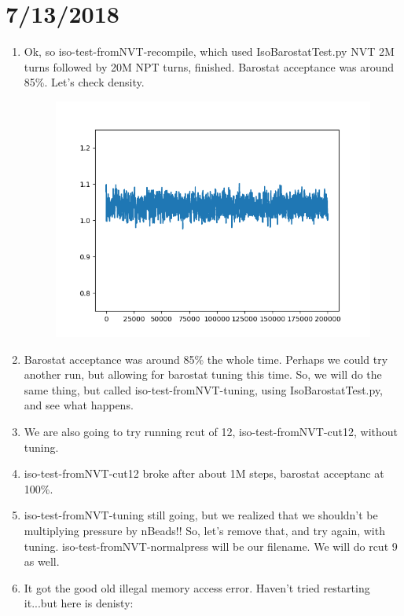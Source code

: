 \documentclass[12pt,reqno]{amsart}
\numberwithin{equation}{section}
\begin{document}
\section{7/13/2018}
\begin{enumerate}
\item Ok, so iso-test-fromNVT-recompile, which used IsoBarostatTest.py NVT 2M turns followed by 20M NPT turns, finished.  Barostat acceptance was around 85\%.  Let's check density.  
\begin{figure}[H]
\centering
\includegraphics[scale=0.6]{densities-iso-test-fromNVT-recompile}
\end{figure}
\item Barostat acceptance was around 85\% the whole time.  Perhaps we could try another run, but allowing for barostat tuning this time.  So, we will do the same thing, but called iso-test-fromNVT-tuning, using IsoBarostatTest.py, and see what happens.  
\item We are also going to try running rcut of 12, iso-test-fromNVT-cut12, without tuning. 
\item iso-test-fromNVT-cut12 broke after about 1M steps, barostat acceptanc at 100\%.  
\item iso-test-fromNVT-tuning still going, but we realized that we shouldn't be multiplying pressure by nBeads!!  So, let's remove that, and try again, with tuning.  iso-test-fromNVT-normalpress will be our filename.  We will do rcut 9 as well.  
\item It got the good old illegal memory access error.  Haven't tried restarting it...but here is denisty:
\end{enumerate}
\end{document}
